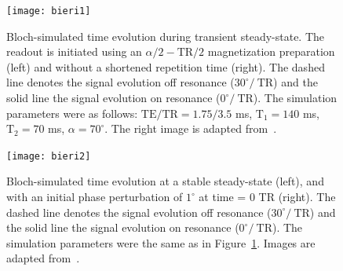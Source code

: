 \begin{figure}
    \centering
    \texttt{[image: bieri1]}
    \caption{Bloch-simulated time evolution during transient steady-state. The readout is initiated using an $\alpha/2-\textrm{TR}/2$ magnetization preparation (left) and without a shortened repetition time (right). The dashed line denotes the signal evolution off resonance ($30^\circ/\ \textrm{TR}$) and the solid line the signal evolution on resonance ($0^\circ/\ \textrm{TR}$). The simulation parameters were as follows: $\textrm{TE}/ \textrm{TR} = 1.75/3.5$ ms, $ \textrm{T}_1 = 140$ ms, $\textrm{T}_2 = 70$ ms, $\alpha = 70^\circ$. The right image is adapted from~\cite{Bieri2005a}.}
    \label{fig:blochplots_2}
\end{figure}
\begin{figure}
    \centering
    \texttt{[image: bieri2]}
    \caption{Bloch-simulated time evolution at a stable steady-state (left), and with an initial phase perturbation of $1^\circ$ at time = 0 TR (right). The dashed line denotes the signal evolution off resonance ($30^\circ/\ \textrm{TR}$) and the solid line the signal evolution on resonance ($0^\circ/\ \textrm{TR}$). The simulation parameters were the same as in Figure~\ref{fig:blochplots_2}. Images are adapted from~\cite{Bieri2005a}.}
    \label{fig:blochplots_3}
\end{figure}

